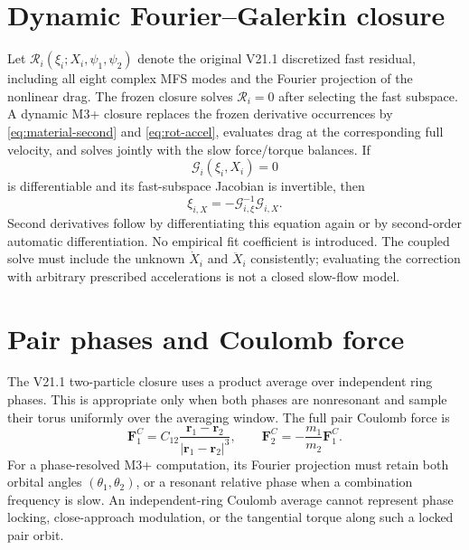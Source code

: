 \documentclass[11pt]{article}
\begin{document}
\section{Dynamic Fourier--Galerkin closure}
Let $\mathcal R_i(\xi_i;X_i,\psi_1,\psi_2)$ denote the original V21.1
discretized fast residual, including all eight complex MFS modes and the
Fourier projection of the nonlinear drag.  The frozen closure solves
$\mathcal R_i=0$ after selecting the fast subspace.  A dynamic M3+ closure
replaces the frozen derivative occurrences by \eqref{eq:material-second}
and \eqref{eq:rot-accel}, evaluates drag at the corresponding full velocity,
and solves jointly with the slow force/torque balances.  If
\begin{equation}
 \mathcal G_i(\xi_i,X_i)=0
\end{equation}
is differentiable and its fast-subspace Jacobian is invertible, then
\begin{equation}
 \xi_{i,X}=-\mathcal G_{i,\xi}^{-1}\mathcal G_{i,X}.
\end{equation}
Second derivatives follow by differentiating this equation again or by
second-order automatic differentiation.  No empirical fit coefficient is
introduced.  The coupled solve must include the unknown $\dot X_i$ and
$\ddot X_i$ consistently; evaluating the correction with arbitrary prescribed
accelerations is not a closed slow-flow model.

\section{Pair phases and Coulomb force}
The V21.1 two-particle closure uses a product average over independent ring
phases.  This is appropriate only when both phases are nonresonant and sample
their torus uniformly over the averaging window.  The full pair Coulomb force
is
\begin{equation}
 \mathbf F^C_1=C_{12}\frac{\mathbf r_1-\mathbf r_2}
 {|\mathbf r_1-\mathbf r_2|^3},\qquad
 \mathbf F^C_2=-\frac{m_1}{m_2}\mathbf F^C_1.
\end{equation}
For a phase-resolved M3+ computation, its Fourier projection must retain both
orbital angles $(\theta_1,\theta_2)$, or a resonant relative phase when a
combination frequency is slow.  An independent-ring Coulomb average cannot
represent phase locking, close-approach modulation, or the tangential torque
along such a locked pair orbit.
\end{document}
